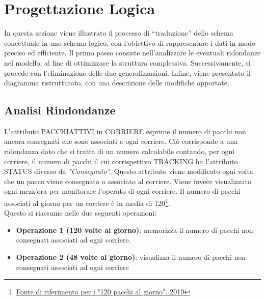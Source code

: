 \section{Progettazione Logica}

In questa sezione viene illustrato il processo di “traduzione” dello schema concettuale in uno schema logico, con l’obiettivo di rappresentare i dati in modo preciso
ed efficiente. Il primo passo consiste nell’analizzare le eventuali ridondanze nel modello, al fine di ottimizzare la struttura complessiva. Successivamente, si procede
con l’eliminazione delle due generalizzazioni. Infine, viene presentato il diagramma
ristrutturato, con una descrizione delle modifiche apportate.

\subsection{Analisi Rindondanze}

L'attributo PACCHIATTIVI in CORRIERE esprime il numero di pacchi non ancora consegnati che sono associati a ogni corriere. Ciò corrisponde a una ridondanza dato che si tratta di un numero calcolabile contando, per ogni corriere, il numero di pacchi il cui corrispettivo TRACKING ha l'attributo STATUS diverso da \textit{"Consegnato"}.
Questo attributo viene modificato ogni volta che un pacco viene consegnato o associato al corriere. Viene invece visualizzato ogni mezz'ora per monitorare l'operato di ogni corriere. Il numero di pacchi associati al giorno per un corriere è in media di 120\footnote{\href{https://www.dire.it/26-02-2019/301816-video-a-milano-la-rabbia-dei-corrieri-di-amazon-quattro-minuti-a-consegna-troppo-pochi/}{Fonte di riferimento per i "120 pacchi al giorno". 2019}}.\\
Questo si riassume nelle due seguenti operazioni:
\begin{itemize}
    \item \textbf{Operazione 1 (120 volte al giorno)}: memorizza il numero di pacchi non consegnati associati ad ogni corriere.
    \item \textbf{Operazione 2 (48 volte al giorno)}: visualizza il numero di pacchi non consegnati associati ad ogni corriere
\end{itemize}




